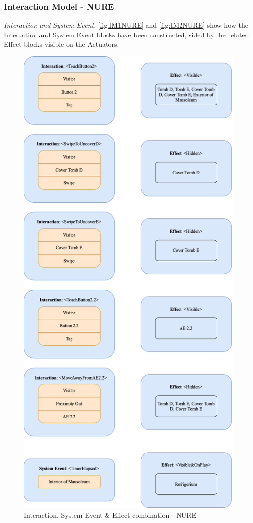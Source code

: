 \subsubsection*{Interaction Model - NURE}

\emph{Interaction and System Event}. \autoref{fig:IM1NURE} and \autoref{fig:IM2NURE} show how the Interaction and System Event blocks have been constructed, sided by the related Effect blocks visible on the Actuators. 

\begin{figure}[h]
	\centering
	\includegraphics[height=0.95\textheight]{Figures/Conceptual Model/IM_NURE.png}
	\caption{Interaction, System Event \& Effect combination - NURE}
	\label{fig:IM1NURE}
\end{figure}
